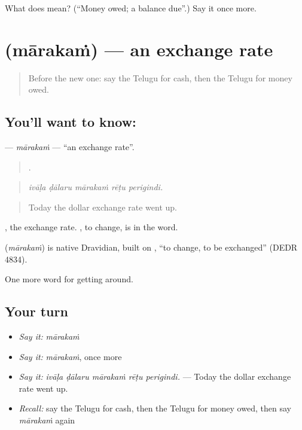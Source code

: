 \begin{tcolorbox}[breakable,colback=teal!4,colframe=teal!35!black,title={Before you move on}]
What does  mean? (\textquotedblleft{}Money owed; a balance due\textquotedblright{}.) Say it once more.
\end{tcolorbox}
\section[\texorpdfstring{\te{మారకం} (mārakaṁ)}{మారకం (mārakaṁ)}]{ (mārakaṁ) — an exchange rate}

\label{lesson:TE-C485-marakam}



\begin{quote}
Before the new one: say the Telugu for cash, then the Telugu for money owed.
\end{quote}

\subsection*{You'll want to know: }
\textbf{} — \emph{mārakaṁ} — \textquotedblleft{}an exchange rate\textquotedblright{}.

\begin{quote}
    .
\end{quote}

\begin{quote}
\emph{ivāḷa ḍālaru mārakaṁ rēṭu perigindi.}
\end{quote}

\begin{quote}
Today the dollar exchange rate went up.
\end{quote}

 , the exchange rate. , to change, is in the word.

\begin{cousinweb}
\textbf{} (\emph{mārakaṁ}) is native Dravidian, built on , \textquotedblleft{}to change, to be exchanged\textquotedblright{} (DEDR 4834).
\end{cousinweb}

\begin{grammarlens}[title={What you've built}]
One more word for getting around.
\end{grammarlens}

\subsection*{Your turn}
\begin{itemize}
\raggedright
  \item \emph{Say it:} \emph{mārakaṁ}
  \item \emph{Say it:} \emph{mārakaṁ}, once more
  \item \emph{Say it:} \emph{ivāḷa ḍālaru mārakaṁ rēṭu perigindi.} — Today the dollar exchange rate went up.
  \item \emph{Recall:} say the Telugu for cash, then the Telugu for money owed, then say \emph{mārakaṁ} again
\end{itemize}


